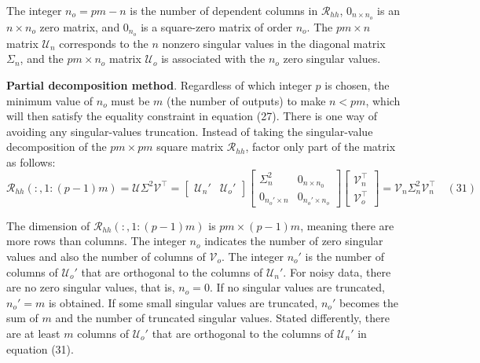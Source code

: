 The integer $n_o=pm-n$ is the number of dependent columns in $\mathcal{R}_{hh}$, $0_{n\times n_o}$ is an $n\times n_o$ zero matrix, and $0_{n_o}$ is a square-zero matrix of order $n_o$. 
The $pm\times n$ matrix $\mathcal{U}_n$ corresponds to the $n$ nonzero singular values in the diagonal matrix $\Sigma_n$, and the $pm\times n_o$ matrix $\mathcal{U}_o$ is associated with the $n_o$ zero singular values. 

\textbf{Partial decomposition method}. 
Regardless of which integer $p$ is chosen, the minimum value of $n_o$ must be $m$ (the number of outputs) to make $n<pm$, which will then satisfy the equality constraint in equation (27). 
There is one way of avoiding any singular-values truncation. 
Instead of taking the singular-value decomposition of the $pm\times pm$ square matrix $\mathcal{R}_{hh}$, factor only part of the matrix as follows: 
\[
    \mathcal{R}_{hh}(:,1:(p-1)m)=\mathcal{U}\Sigma^2\mathcal{V}^\top 
    =\begin{bmatrix}
        \mathcal{U}_n'&\mathcal{U}_o'
    \end{bmatrix}
    \begin{bmatrix}
        \Sigma_n^2&0_{n\times n_0}\\
        0_{n_o'\times n}&0_{n_o'\times n_o}
    \end{bmatrix}
    \begin{bmatrix}
        \mathcal{V}_n^\top\\
        \mathcal{V}_o^\top
    \end{bmatrix}
    =\mathcal{V}_n\Sigma_n^2\mathcal{V}_n^\top
    \quad (31)
\]

The dimension of $\mathcal{R}_{hh}(:,1:(p-1)m)$ is $pm\times (p-1)m$, meaning there are more rows than columns. 
The integer $n_o$ indicates the number of zero singular values and also the number of columns of $\mathcal{V}_o$. 
The integer $n_o'$ is the number of columns of $\mathcal{U}_o'$ that are orthogonal to the columns of $\mathcal{U}_n'$. 
For noisy data, there are no zero singular values, that is, $n_o=0$. 
If no singular values are truncated, $n_o'=m$ is obtained. 
If some small singular values are truncated, $n_o'$ becomes the sum of $m$ and the number of truncated singular values. 
Stated differently, there are at least $m$ columns of $\mathcal{U}_o'$ that are orthogonal to the columns of $\mathcal{U}_n'$ in equation (31). 

